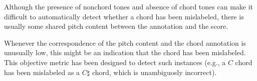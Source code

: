 
Although the presence of nonchord tones and absence of chord
tones can make it difficult to automatically detect whether
a chord has been mislabeled, there is usually some shared
pitch content between the annotation and the score.

Whenever the correspondence of the pitch content and the
chord annotation is unusually low, this might be an
indication that the chord has been mislabeled. This
objective metric has been designed to detect such instances
(e.g., a $C$ chord has been mislabeled as a $C\sharp$ chord,
which is unambiguosly incorrect).